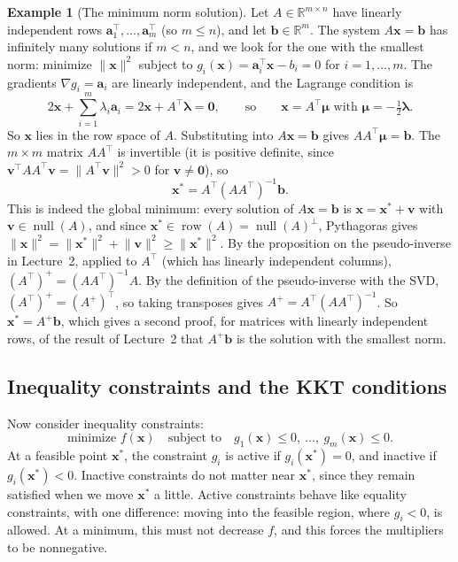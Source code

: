 \documentclass[11pt]{article}
\newcommand{\norm}[1]{\lVert #1 \rVert}
\theoremstyle{definition}
\newtheorem{example}[definition]{Example}
\theoremstyle{plain}
\theoremstyle{remark}
\DeclareMathOperator{\Null}{null}
\DeclareMathOperator{\row}{row}
\begin{document}
\begin{example}[The minimum norm solution]\label{ex:min-norm}
    Let $A \in \mathbb{R}^{m \times n}$ have linearly independent rows $\mathbf{a}_1^\top, \ldots, \mathbf{a}_m^\top$ (so $m \leq n$), and let $\mathbf{b} \in \mathbb{R}^m$. The system $A\mathbf{x} = \mathbf{b}$ has infinitely many solutions if $m < n$, and we look for the one with the smallest norm: minimize $\norm{\mathbf{x}}^2$ subject to $g_i(\mathbf{x}) = \mathbf{a}_i^\top\mathbf{x} - b_i = 0$ for $i = 1, \ldots, m$. The gradients $\nabla g_i = \mathbf{a}_i$ are linearly independent, and the Lagrange condition is
    \[2\mathbf{x} + \sum_{i=1}^m \lambda_i\mathbf{a}_i = 2\mathbf{x} + A^\top\boldsymbol{\lambda} = \mathbf{0}, \qquad \text{so} \qquad \mathbf{x} = A^\top\boldsymbol{\mu} \text{ with } \boldsymbol{\mu} = -\tfrac{1}{2}\boldsymbol{\lambda}.\]
    So $\mathbf{x}$ lies in the row space of $A$. Substituting into $A\mathbf{x} = \mathbf{b}$ gives $AA^\top\boldsymbol{\mu} = \mathbf{b}$. The $m \times m$ matrix $AA^\top$ is invertible (it is positive definite, since $\mathbf{v}^\top AA^\top\mathbf{v} = \norm{A^\top\mathbf{v}}^2 > 0$ for $\mathbf{v} \neq \mathbf{0}$), so
    \[\mathbf{x}^* = A^\top(AA^\top)^{-1}\mathbf{b}.\]
    This is indeed the global minimum: every solution of $A\mathbf{x} = \mathbf{b}$ is $\mathbf{x} = \mathbf{x}^* + \mathbf{v}$ with $\mathbf{v} \in \Null(A)$, and since $\mathbf{x}^* \in \row(A) = \Null(A)^\perp$, Pythagoras gives $\norm{\mathbf{x}}^2 = \norm{\mathbf{x}^*}^2 + \norm{\mathbf{v}}^2 \geq \norm{\mathbf{x}^*}^2$. By the proposition on the pseudo-inverse in Lecture~2, applied to $A^\top$ (which has linearly independent columns), $(A^\top)^+ = (AA^\top)^{-1}A$. By the definition of the pseudo-inverse with the SVD, $(A^\top)^+ = (A^+)^\top$, so taking transposes gives $A^+ = A^\top(AA^\top)^{-1}$. So $\mathbf{x}^* = A^+\mathbf{b}$, which gives a second proof, for matrices with linearly independent rows, of the result of Lecture~2 that $A^+\mathbf{b}$ is the solution with the smallest norm.
\end{example}

\subsection{Inequality constraints and the KKT conditions}

Now consider inequality constraints:
\[\text{minimize } f(\mathbf{x}) \quad \text{subject to} \quad g_1(\mathbf{x}) \leq 0, \ \ldots, \ g_m(\mathbf{x}) \leq 0.\]
At a feasible point $\mathbf{x}^*$, the constraint $g_i$ is active if $g_i(\mathbf{x}^*) = 0$, and inactive if $g_i(\mathbf{x}^*) < 0$. Inactive constraints do not matter near $\mathbf{x}^*$, since they remain satisfied when we move $\mathbf{x}^*$ a little. Active constraints behave like equality constraints, with one difference: moving into the feasible region, where $g_i < 0$, is allowed. At a minimum, this must not decrease $f$, and this forces the multipliers to be nonnegative.
\end{document}
